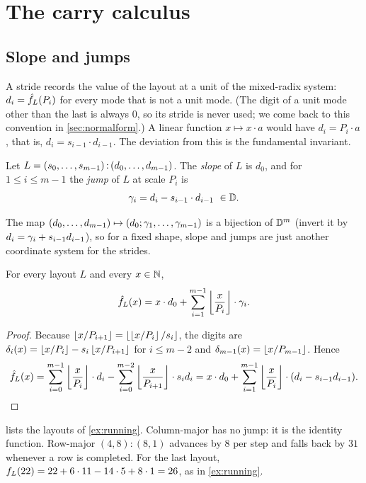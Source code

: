 \section{The carry calculus}\label{sec:carry}

\subsection{Slope and jumps}

A stride records the value of the layout at a unit of the mixed-radix system:
$d_i=\hat{f}_{L}(P_i)$ for every mode that is not a unit mode. (The digit of a unit mode other than the
last is always $0$, so its stride is never used; we come back to this convention in
\cref{sec:normalform}.) A linear function $x\mapsto x\cdot a$ would have $d_i=P_i\cdot a$, that is,
$d_i=s_{i-1}\cdot d_{i-1}$. The deviation from this is the fundamental invariant.

\begin{definition}\label{def:jumps}
Let $L=(s_0,\dots,s_{m-1})\,{:}\,(d_0,\dots,d_{m-1})$. The \emph{slope} of $L$ is $d_0$, and for
$1\le i\le m-1$ the \emph{jump} of $L$ at scale $P_i$ is
\[ \jump_i = d_i - s_{i-1}\cdot d_{i-1}\ \in\D . \]
\end{definition}
\noindent The map $(d_0,\dots,d_{m-1})\mapsto(d_0;\gamma_1,\dots,\gamma_{m-1})$ is a bijection of
$\mathbb{D}^m$ (invert it by $d_i=\gamma_i+s_{i-1}d_{i-1}$), so for a fixed shape, slope and jumps are just
another coordinate system for the strides.

\begin{proposition}\label{prop:floorsum}
For every layout $L$ and every $x\in\mathbb{N}$,
\begin{equation}\label{eq:floorsum}
 \hat{f}_{L}(x)=x\cdot d_0+\sum_{i=1}^{m-1}\left\lfloor \frac{x}{P_i} \right\rfloor\cdot\gamma_i .
\end{equation}
\end{proposition}
\begin{proof}
Because $\left\lfloor x/P_{i+1} \right\rfloor=\left\lfloor \left\lfloor x/P_i \right\rfloor/s_i \right\rfloor$, the digits are
$\delta_i(x)=\left\lfloor x/P_i \right\rfloor-s_i\left\lfloor x/P_{i+1} \right\rfloor$ for $i\le m-2$ and $\delta_{m-1}(x)=\left\lfloor x/P_{m-1} \right\rfloor$.
Hence
\[ \hat{f}_{L}(x)=\sum_{i=0}^{m-1}\left\lfloor \frac{x}{P_i} \right\rfloor\cdot d_i-\sum_{i=0}^{m-2}\left\lfloor \frac{x}{P_{i+1}} \right\rfloor\cdot s_id_i
 =x\cdot d_0+\sum_{i=1}^{m-1}\left\lfloor \frac{x}{P_i} \right\rfloor\cdot(d_i-s_{i-1}d_{i-1}). \qedhere \]
\end{proof}

\begin{example}\label{ex:jumps}
 lists the layouts of \cref{ex:running}. Column-major has no jump: it is the
identity function. Row-major $(4,8):(8,1)$ advances by $8$ per step and falls back by $31$
whenever a row is completed. For the last layout,
$f_{L}(22)=22+6\cdot 11-14\cdot 5+8\cdot 1=26$, as in \cref{ex:running}.
\end{example}

